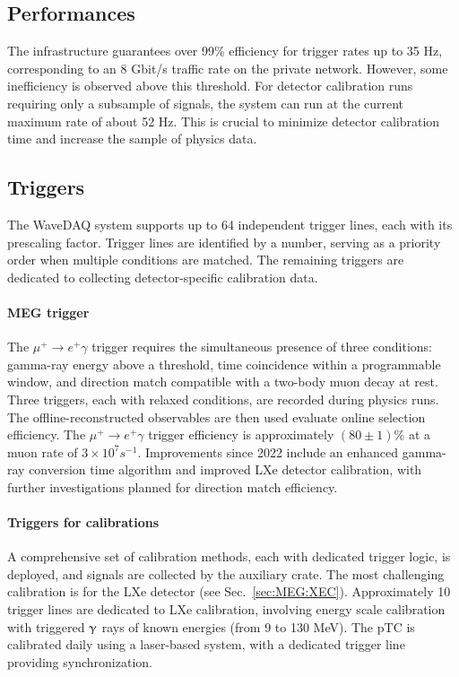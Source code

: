 \begin{refsection}
    \subsection{Performances}
        The infrastructure guarantees over 99\% efficiency for trigger rates up to 35 Hz, corresponding to an 8 Gbit/s traffic rate on the private network. 
        However, some inefficiency is observed above this threshold.
        For detector calibration runs requiring only a subsample of signals, the system can run at the current maximum rate of about 52 Hz. 
        This is crucial to minimize detector calibration time and increase the sample of physics data.
        
    \subsection{Triggers}
        The WaveDAQ system supports up to 64 independent trigger lines, each with its prescaling factor. 
        Trigger lines are identified by a number, serving as a priority order when multiple conditions are matched. 
        The remaining triggers are dedicated to collecting detector-specific calibration data.
        
        \paragraph{MEG trigger}
        The $\mu^+ \to e^+ \gamma$ trigger requires the simultaneous presence of three conditions: gamma-ray energy above a threshold, time coincidence within a programmable window, and direction match compatible with a two-body muon decay at rest. 
        Three triggers, each with relaxed conditions, are recorded during physics runs.        
        The offline-reconstructed observables are then used evaluate online selection efficiency. 
        The $\mu^+ \to e^+\gamma$ trigger efficiency is approximately $(80 \pm 1)\%$ at a muon rate of $3 \times 10^7 s^{-1}$. 
        Improvements since 2022 include an enhanced gamma-ray conversion time algorithm and improved LXe detector calibration, with further investigations planned for direction match efficiency.

        \paragraph{Triggers for calibrations}
        A comprehensive set of calibration methods, each with dedicated trigger logic, is deployed, and signals are collected by the auxiliary crate.
        The most challenging calibration is for the LXe detector (see Sec.~\ref{sec:MEG:XEC}). 
        Approximately 10 trigger lines are dedicated to LXe calibration, involving energy scale calibration with triggered $\upgamma$ rays of known energies (from 9 to 130 MeV). 
        The pTC is calibrated daily using a laser-based system, with a dedicated trigger line providing synchronization. 
        

\end{refsection}
